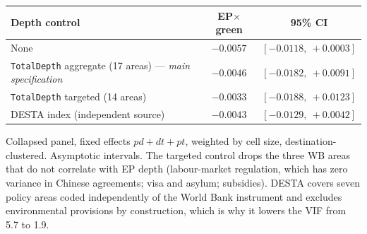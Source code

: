 \small
\begin{threeparttable}
\begin{tabular}{lcc}
\toprule
Depth control & EP$\times$green & 95\% CI \\
\midrule
None & $-0.0057$ & $[-0.0118,\ +0.0003]$ \\
\texttt{TotalDepth} aggregate (17 areas) --- \emph{main specification} & $-0.0046$ & $[-0.0182,\ +0.0091]$ \\
\texttt{TotalDepth} targeted (14 areas) & $-0.0033$ & $[-0.0188,\ +0.0123]$ \\
DESTA index (independent source) & $-0.0043$ & $[-0.0129,\ +0.0042]$ \\
\bottomrule
\end{tabular}
\begin{tablenotes}\footnotesize
\item Collapsed panel, fixed effects $pd+dt+pt$, weighted by cell size, destination-clustered.
Asymptotic intervals. The targeted control drops the three WB areas that do not correlate
with EP depth (labour-market regulation, which has zero variance in Chinese agreements;
visa and asylum; subsidies). DESTA covers seven policy areas coded independently of the
World Bank instrument and excludes environmental provisions by construction, which is why
it lowers the VIF from 5.7 to 1.9.
\end{tablenotes}
\end{threeparttable}
